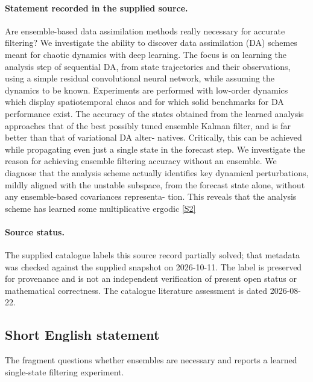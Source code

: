 \documentclass[11pt]{article}
\newcommand{\sref}[2]{\hyperlink{source:#1:#2}{[S#2]}}
\begin{document}
\paragraph{Statement recorded in the supplied source.}
Are ensemble-based data assimilation methods really necessary for accurate filtering? We investigate the ability to discover data assimilation (DA) schemes meant for chaotic dynamics with deep learning. The focus is on learning the analysis step of sequential DA, from state trajectories and their observations, using a simple residual convolutional neural network, while assuming the dynamics to be known. Experiments are performed with low-order dynamics which display spatiotemporal chaos and for which solid benchmarks for DA performance exist. The accuracy of the states obtained from the learned analysis approaches that of the best possibly tuned ensemble Kalman filter, and is far better than that of variational DA alter- natives. Critically, this can be achieved while propagating even just a single state in the forecast step. We investigate the reason for achieving ensemble filtering accuracy without an ensemble. We diagnose that the analysis scheme actually identifies key dynamical perturbations, mildly aligned with the unstable subspace, from the forecast state alone, without any ensemble-based covariances representa- tion. This reveals that the analysis scheme has learned some multiplicative ergodic \sref{30006233}{2}
\paragraph{Source status.}
The supplied catalogue labels this source record partially solved; that metadata was checked against the supplied snapshot on 2026-10-11. The label is preserved for provenance and is not an independent verification of present open status or mathematical correctness. The catalogue literature assessment is dated 2026-08-22.
\subsection{Short English statement}
The fragment questions whether ensembles are necessary and reports a learned single-state filtering experiment.
\end{document}
